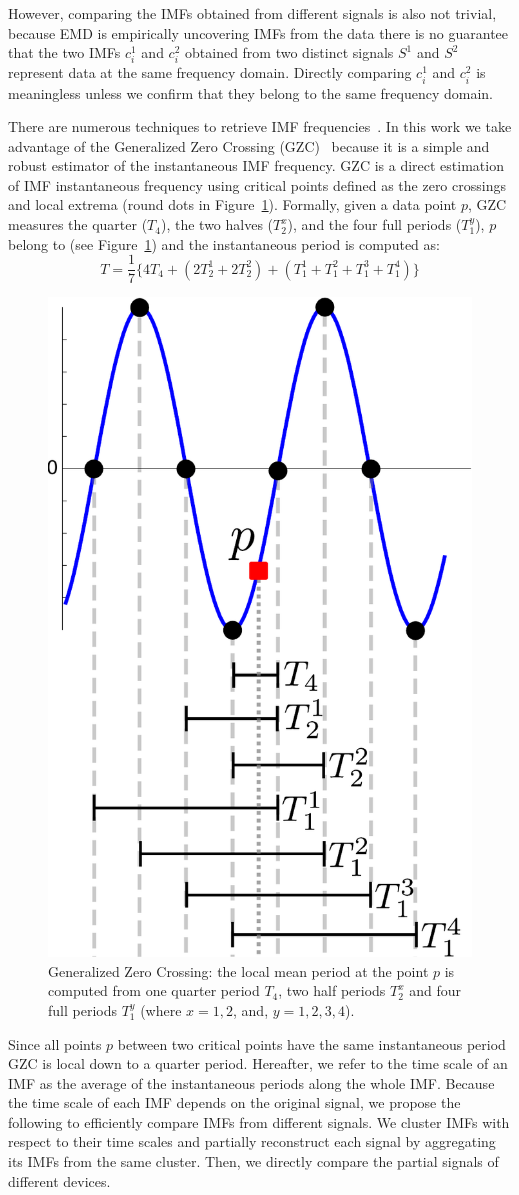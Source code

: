 However, comparing the IMFs obtained from different signals is also not trivial,
 because EMD is empirically uncovering IMFs from the data there is no guarantee that the two IMFs $c_i^1$ and $c_i^2$ obtained from two distinct signals $S^1$ and $S^2$ represent data at the same frequency domain.
Directly comparing $c_i^1$ and $c_i^2$ is meaningless unless we confirm that they belong to the same frequency domain.

There are numerous techniques to retrieve IMF frequencies~\cite{huang:aada2009}.  
In this work we take advantage of the Generalized Zero Crossing (GZC)~\cite{huang:patent2006} because it is a simple and robust 
estimator of the instantaneous IMF 
frequency\cite{huang:aada2009}.
GZC is a direct estimation of IMF instantaneous frequency using critical points defined as the zero crossings and local extrema 
(round dots in Figure~\ref{fig:gzc}).
Formally, given a data point $p$, GZC measures the quarter ($T_4$), the two halves ($T_2^x$), and the four full periods ($T_1^y$), $p$   
belong to (see Figure~\ref{fig:gzc}) and the instantaneous period is computed as:
\[T=\frac{1}{7}\{4T_4+(2T_2^1+2T_2^2)+(T_1^1+T_1^2+T_1^3+T_1^4)\}\]

\begin{figure}
\begin{center}
 \includegraphics[width=.25\textwidth]{figs/gzc.pdf}
 \end{center}
 \caption{Generalized Zero Crossing: the local mean period at the point $p$ is computed from one quarter period $T_4$, two half periods $T_2^x$ and four full periods $T_1^y$ (where $x=1, 2$, and, $y=1,2,3,4$).}
 \label{fig:gzc}
\end{figure}

Since all points $p$ between two critical points have the same instantaneous period GZC is local down to a quarter period.
Hereafter, we refer to the time scale of an IMF as the average of the instantaneous periods along the whole IMF.
Because the time scale of each IMF depends on the original signal, we propose the following to efficiently compare IMFs from different signals.
We cluster IMFs with respect to their time scales and partially reconstruct each signal by aggregating its IMFs from the 
same cluster.  Then, we directly compare the partial signals of different devices.

